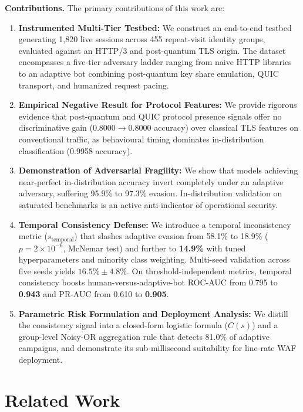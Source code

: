 \documentclass[conference]{IEEEtran}
\begin{document}
\noindent\textbf{Contributions.} The primary contributions of this work are:
\begin{enumerate}
    \item \textbf{Instrumented Multi-Tier Testbed:} We construct an end-to-end testbed generating 1,820 live sessions across 455 repeat-visit identity groups, evaluated against an HTTP/3 and post-quantum TLS origin. The dataset encompasses a five-tier adversary ladder ranging from naive HTTP libraries to an adaptive bot combining post-quantum key share emulation, QUIC transport, and humanized request pacing.
    \item \textbf{Empirical Negative Result for Protocol Features:} We provide rigorous evidence that post-quantum and QUIC protocol presence signals offer no discriminative gain ($0.8000 \to 0.8000$ accuracy) over classical TLS features on conventional traffic, as behavioural timing dominates in-distribution classification (0.9958 accuracy).
    \item \textbf{Demonstration of Adversarial Fragility:} We show that models achieving near-perfect in-distribution accuracy invert completely under an adaptive adversary, suffering 95.9\% to 97.3\% evasion. In-distribution validation on saturated benchmarks is an active anti-indicator of operational security.
    \item \textbf{Temporal Consistency Defense:} We introduce a temporal inconsistency metric ($s_{\text{temporal}}$) that slashes adaptive evasion from 58.1\% to 18.9\% ($p = 2 \times 10^{-6}$, McNemar test) and further to \textbf{14.9\%} with tuned hyperparameters and minority class weighting. Multi-seed validation across five seeds yields $16.5\% \pm 4.8\%$. On threshold-independent metrics, temporal consistency boosts human-versus-adaptive-bot ROC-AUC from 0.795 to \textbf{0.943} and PR-AUC from 0.610 to \textbf{0.905}.
    \item \textbf{Parametric Risk Formulation and Deployment Analysis:} We distill the consistency signal into a closed-form logistic formula ($C(s)$) and a group-level Noisy-OR aggregation rule that detects 81.0\% of adaptive campaigns, and demonstrate its sub-millisecond suitability for line-rate WAF deployment.
\end{enumerate}

\section{Related Work}
\end{document}
